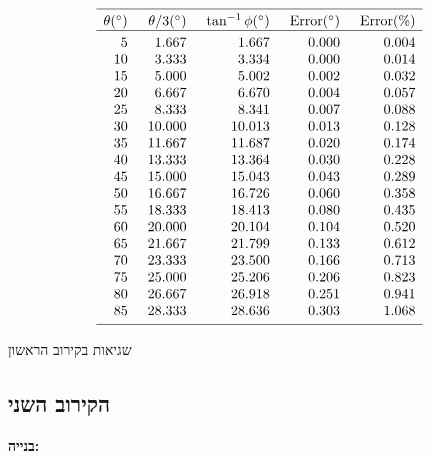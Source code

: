 \begin{table}[t]
\[
%
\begin{array}{r@{\hspace{5mm}}r@{\hspace{5mm}}r@{\hspace{5mm}}r@{\hspace{5mm}}r}
\hline
\noalign{\smallskip}
\theta ({}^\circ) & \theta/3 ({}^\circ)& \tan^{-1} \phi ({}^\circ) & \mathrm{Error} ({}^\circ) & \mathrm{Error (\%)}\\\hline
\noalign{\smallskip}
  5 &    1.667 &    1.667  &     0.000 &    0.004 \\
 10 &    3.333 &    3.334  &     0.000 &    0.014 \\
 15 &    5.000 &    5.002  &     0.002 &    0.032 \\
 20 &    6.667 &    6.670  &     0.004 &    0.057 \\
 25 &    8.333 &    8.341  &     0.007 &    0.088 \\
 30 &   10.000 &   10.013  &     0.013 &    0.128 \\
 35 &   11.667 &   11.687  &     0.020 &    0.174 \\
 40 &   13.333 &   13.364  &     0.030 &    0.228 \\
 45 &   15.000 &   15.043  &     0.043 &    0.289 \\
 50 &   16.667 &   16.726  &     0.060 &    0.358 \\
 55 &   18.333 &   18.413  &     0.080 &    0.435 \\
 60 &   20.000 &   20.104  &     0.104 &    0.520 \\
 65 &   21.667 &   21.799  &     0.133 &    0.612 \\
 70 &   23.333 &   23.500  &     0.166 &    0.713 \\
 75 &   25.000 &   25.206  &     0.206 &    0.823 \\
 80 &   26.667 &   26.918  &     0.251 &    0.941 \\
 85 &   28.333 &   28.636  &     0.303 &    1.068 \\
 \noalign{\smallskip}
 \hline
 \end{array}
\]
\caption{שגיאות בקירוב הראשון}\label{t.trisect-first}
\end{table}

\subsection{הקירוב השני}

\noindent\textbf{בנייה:}

